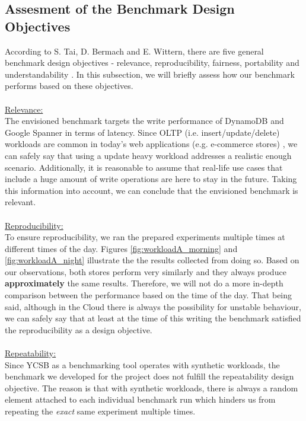 \documentclass[letterpaper, 10 pt, conference]{ieeeconf}  %
\begin{document}
\subsection{Assesment of the Benchmark Design Objectives}
According to S. Tai, D. Bermach and E. Wittern, there are five general benchmark design objectives - relevance, reproducibility, fairness, portability and understandability \cite{StefanTaiBook}. In this subsection, we will briefly assess how our benchmark performs based on these objectives.
\\
\\
\underline{Relevance:}
\\
The envisioned benchmark targets the write performance of DynamoDB and Google Spanner in terms of latency. Since OLTP (i.e. insert/update/delete) workloads are common in today's web applications \cite{OLTp} (e.g. e-commerce stores) , we can safely say that using a update heavy workload addresses a realistic enough scenario. Additionally, it is reasonable to assume that real-life use cases that include a huge amount of write operations are here to stay in the future. Taking this information into account, we can conclude that the envisioned benchmark is relevant.
\\
\\
\underline{Reproducibility:}
\\
To ensure reproducibility, we ran the prepared experiments multiple times at different times of the day. Figures \ref{fig:workloadA_morning} and \ref{fig:workloadA_night} illustrate the the results collected from doing so. Based on our observations, both stores perform very similarly and they always produce \textbf{approximately} the same results. Therefore, we will not do a more in-depth comparison between the performance based on the time of the day. That being said, although in the Cloud there is always the possibility for unstable behaviour, we can safely say that at least at the time of this writing the benchmark satisfied the reproducibility as a design objective.
\\
\\
\underline{Repeatability:}
\\
Since YCSB as a benchmarking tool operates with synthetic workloads, the benchmark we developed for the project does not fulfill the repeatability design objective. The reason is that with synthetic workloads, there is always a random element attached to each individual benchmark run which hinders us from repeating the \textit{exact} same experiment multiple times.
\\
\end{document}
